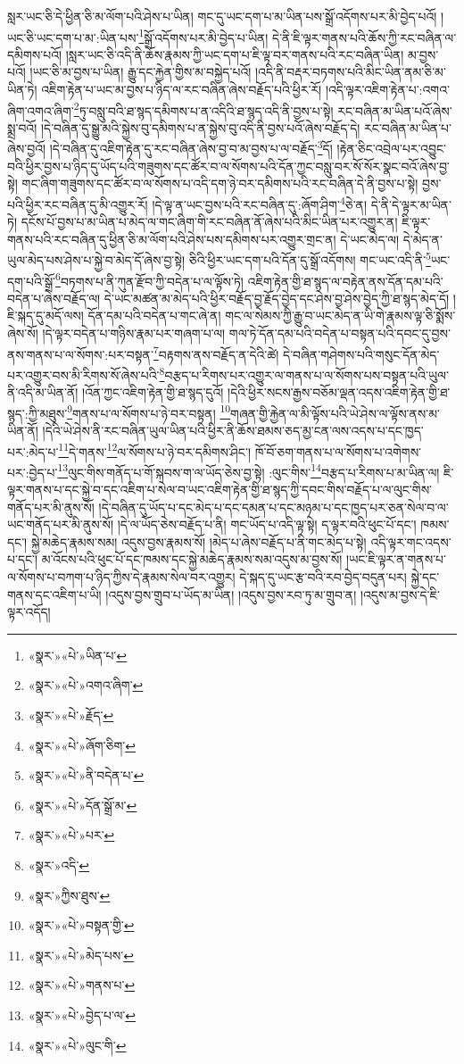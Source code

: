 སླར་ཡང་ཅི་དེ་ཕྱིན་ཅི་མ་ལོག་པའི་ཤེས་པ་ཡིན། གང་དུ་ཡང་དག་པ་མ་ཡིན་པས་སྒྲོ་འདོགས་པར་མི་བྱེད་པའོ། །ཡང་ཅི་ཡང་དག་པ་མ་:ཡིན་པས་\footnote{«སྣར་»«པེ་»ཡིན་པ་}སྒྲོ་འདོགས་པར་མི་བྱེད་པ་ཡིན། དེ་ནི་ཇི་ལྟར་གནས་པའི་ཆོས་ཀྱི་རང་བཞིན་ལ་དམིགས་པའོ། །སླར་ཡང་ཅི་འདི་ནི་ཆོས་རྣམས་ཀྱི་ཡང་དག་པ་ཇི་ལྟ་བར་གནས་པའི་རང་བཞིན་ཡིན། མ་བྱས་པའོ། །ཡང་ཅི་མ་བྱས་པ་ཡིན། རྒྱུ་དང་རྐྱེན་གྱིས་མ་བསྐྱེད་པའོ། །འདི་ནི་བརྡར་བཏགས་པའི་མིང་ཡིན་ནམ་ཅི་མ་ཡིན་ཏེ། འཇིག་རྟེན་པ་ཡང་མ་བྱས་པ་ཉིད་ལ་རང་བཞིན་ཞེས་བརྗོད་པའི་ཕྱིར་རོ། །འདི་ལྟར་འཇིག་རྟེན་པ་:འགའ་ཞིག་འགའ་ཞིག་\footnote{«སྣར་»«པེ་»འགའ་ཞིག་}ཏུ་བསླུ་བའི་ཐ་སྙད་དམིགས་པ་ན་འདིའི་ཐ་སྙད་འདི་ནི་བྱས་པ་སྟེ། རང་བཞིན་མ་ཡིན་པའོ་ཞེས་སྨྲ་བའོ། །དེ་བཞིན་དུ་སྒྱུ་མའི་སྐྱེས་བུ་དམིགས་པ་ན་སྐྱེས་བུ་འདི་ནི་བྱས་པའོ་ཞེས་བརྗོད་དེ། རང་བཞིན་མ་ཡིན་པ་ཞེས་བྱའོ། །དེ་བཞིན་དུ་འཇིག་རྟེན་དུ་རང་བཞིན་ཞེས་བྱ་བ་མ་བྱས་པ་ལ་བརྗོད་\footnote{«སྣར་»«པེ་»རྗོད་}དོ། །རྟེན་ཅིང་འབྲེལ་པར་འབྱུང་བའི་ཕྱིར་བྱས་པ་ཉིད་དུ་ཡོད་པའི་གཟུགས་དང་ཚོར་བ་ལ་སོགས་པའི་དོན་ཀྱང་བསླུ་བར་སོ་སོར་སྣང་བའོ་ཞེས་བྱ་སྟེ། གང་ཞིག་གཟུགས་དང་ཚོར་བ་ལ་སོགས་པ་འདི་དག་ཉེ་བར་དམིགས་པའི་རང་བཞིན་དེ་ནི་བྱས་པ་སྟེ། བྱས་པའི་ཕྱིར་རང་བཞིན་དུ་མི་འགྱུར་རོ། །དེ་ལྟ་ན་ཡང་བྱས་པའི་རང་བཞིན་དུ་:ཞོག་ཤིག་\footnote{«སྣར་»«པེ་»ཞོག་ཅིག་}ཅེ་ན། དེ་ནི་དེ་ལྟར་མ་ཡིན་ཏེ། དངོས་པོ་བྱས་པ་མ་ཡིན་པ་མེད་ལ་གང་ཞིག་གི་རང་བཞིན་ནོ་ཞེས་པའི་མིང་ཡིན་པར་འགྱུར་ན། ཇི་ལྟར་གནས་པའི་རང་བཞིན་དུ་ཕྱིན་ཅི་མ་ལོག་པའི་ཤེས་པས་དམིགས་པར་འགྱུར་གྲང་ན། དེ་ཡང་མེད་ལ། དེ་མེད་ན་ཡུལ་མེད་པས་ཤེས་པ་སྐྱེ་བ་མེད་དོ་ཞེས་བྱ་སྟེ། ཅིའི་ཕྱིར་ཡང་དག་པའི་དོན་དུ་སྒྲོ་འདོགས། གང་ཡང་འདི་ནི་\footnote{«སྣར་»«པེ་»ནི་བདེན་པ་}ཡང་དག་པའི་སྒྲོ་\footnote{«སྣར་»«པེ་»དོན་སྒྲོ་མ་}བཏགས་པ་ནི་ཀུན་རྫོབ་ཀྱི་བདེན་པ་ལ་ལྟོས་ཏེ། འཇིག་རྟེན་གྱི་ཐ་སྙད་ལ་བརྟེན་ནས་དོན་དམ་པའི་བདེན་པ་ཞེས་བརྗོད་ལ། དེ་ཡང་མཚན་མ་མེད་པའི་ཕྱིར་བརྗོད་བྱ་རྗོད་བྱེད་དང་ཤེས་བྱ་ཤེས་བྱེད་ཀྱི་ཐ་སྙད་མེད་དོ། །ཇི་སྐད་དུ་མདོ་ལས། དོན་དམ་པའི་བདེན་པ་གང་ཞེ་ན། གང་ལ་སེམས་ཀྱི་རྒྱུ་བ་ཡང་མེད་ན་ཡི་གེ་རྣམས་ལྟ་ཅི་སྨོས་ཞེས་སོ། །དེ་ལྟར་བདེན་པ་གཉིས་རྣམ་པར་གཞག་པ་ལ། གལ་ཏེ་དོན་དམ་པའི་བདེན་པ་བསྟན་པའི་དབང་དུ་བྱས་ནས་གནས་པ་ལ་སོགས་:པར་བསྟན་\footnote{«སྣར་»«པེ་»པར་}བརྟགས་ནས་བརྗོད་ན་དེའི་ཚེ། དེ་བཞིན་གཤེགས་པའི་གསུང་དོན་མེད་པར་འགྱུར་བས་མི་རིགས་སོ་ཞེས་པའི་\footnote{«སྣར་»འདི་}བརྩད་པ་རིགས་པར་འགྱུར་ལ་གནས་པ་ལ་སོགས་པས་བསྟན་པའི་ཡུལ་ནི་འདི་མ་ཡིན་ནོ། །འོན་ཀྱང་འཇིག་རྟེན་གྱི་ཐ་སྙད་དུའོ། །དེའི་ཕྱིར་སངས་རྒྱས་བཅོམ་ལྡན་འདས་འཇིག་རྟེན་གྱི་ཐ་སྙད་:ཀྱི་མཐུས་\footnote{«སྣར་»ཀྱིས་ཐུས་}གནས་པ་ལ་སོགས་པ་ཉེ་བར་བསྟན། \footnote{«སྣར་»«པེ་»བསྟན་གྱི་}གཞན་གྱི་རྐྱེན་ལ་མི་ལྟོས་པའི་ཡེ་ཤེས་ལ་ལྟོས་ནས་མ་ཡིན་ནོ། །དེའི་ཡེ་ཤེས་ནི་རང་བཞིན་ཡུལ་ཡིན་པའི་ཕྱིར་ནི་ཆོས་ཐམས་ཅད་མྱ་ངན་ལས་འདས་པ་དང་ཁྱད་པར་:མེད་པ་\footnote{«སྣར་»«པེ་»མེད་པས་}དེ་གནས་\footnote{«སྣར་»«པེ་»གནས་པ་}ལ་སོགས་པ་ཉེ་བར་དམིགས་ཤིང་། ཁོ་བོ་ཅག་གནས་པ་ལ་སོགས་པ་འགེགས་པར་:བྱེད་པ་\footnote{«སྣར་»«པེ་»བྱེད་པ་ལ་}ལུང་གིས་གནོད་པ་གོ་སྐབས་ག་ལ་ཡོད་ཅེས་བྱ་སྟེ། :ལུང་གིས་\footnote{«སྣར་»«པེ་»ལུང་གི་}བརྩད་པ་རིགས་པ་མ་ཡིན་ལ། ཇི་ལྟར་གནས་པ་དང་སྐྱེ་བ་དང་འཇིག་པ་སེལ་བ་ཡང་འཇིག་རྟེན་གྱི་ཐ་སྙད་ཀྱི་དབང་གིས་བརྗོད་པ་ལ་ལུང་གིས་གནོད་པར་མི་ནུས་སོ། །དེ་བཞིན་དུ་ཡོད་པ་དང་མེད་པ་དང་དམན་པ་དང་མཉམ་པ་དང་ཁྱད་པར་ཅན་སེལ་བ་ལ་ཡང་གནོད་པར་མི་ནུས་སོ། །དེ་ལ་ཡོད་ཅེས་བརྗོད་པ་ནི། གང་ཡོད་པ་འདི་ལྟ་སྟེ། ད་ལྟར་བའི་ཕུང་པོ་དང་། ཁམས་དང་། སྐྱེ་མཆེད་རྣམས་སམ། འདུས་བྱས་རྣམས་སོ། །མེད་པ་ཞེས་བརྗོད་པ་ནི་གང་མེད་པ་སྟེ། འདི་ལྟར་གང་འདས་པ་དང་། མ་འོངས་པའི་ཕུང་པོ་དང་ཁམས་དང་སྐྱེ་མཆེད་རྣམས་སམ་འདུས་མ་བྱས་སོ། །ཡང་ཇི་ལྟར་ན་གནས་པ་ལ་སོགས་པ་བཀག་པ་ཉིད་ཀྱིས་དེ་རྣམས་སེལ་བར་འགྱུར། དེ་སྐད་དུ་ཡང་རྩ་བའི་རབ་བྱེད་བདུན་པར། སྐྱེ་དང་གནས་དང་འཇིག་པ་ཡི། །འདུས་བྱས་གྲུབ་པ་ཡོད་མ་ཡིན། །འདུས་བྱས་རབ་ཏུ་མ་གྲུབ་ན། །འདུས་མ་བྱས་དེ་ཇི་ལྟར་འདོད། 